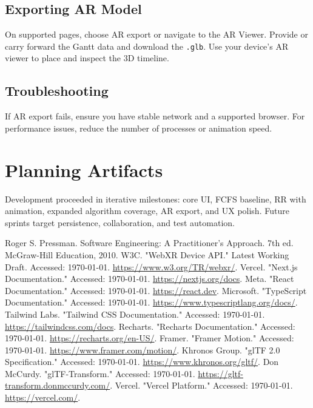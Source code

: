 \documentclass[12pt,a4paper,oneside]{report}
\begin{document}
\section*{Exporting AR Model}
On supported pages, choose AR export or navigate to the AR Viewer. Provide or carry forward the Gantt data and download the \texttt{.glb}. Use your device’s AR viewer to place and inspect the 3D timeline.

\section*{Troubleshooting}
If AR export fails, ensure you have stable network and a supported browser. For performance issues, reduce the number of processes or animation speed.

\chapter{Planning Artifacts}
Development proceeded in iterative milestones: core UI, FCFS baseline, RR with animation, expanded algorithm coverage, AR export, and UX polish. Future sprints target persistence, collaboration, and test automation.

\clearpage
\renewcommand\refname{References}
\begin{thebibliography}{99}
\setlength{\itemsep}{\baselineskip} %
\setlength{\parsep}{0pt}
\setlength{\parskip}{0pt}
\small %
 Roger S. Pressman. Software Engineering: A Practitioner’s Approach. 7th ed. McGraw-Hill Education, 2010.
 W3C. "WebXR Device API." Latest Working Draft. Accessed: \today. \url{https://www.w3.org/TR/webxr/}.
 Vercel. "Next.js Documentation." Accessed: \today. \url{https://nextjs.org/docs}.
 Meta. "React Documentation." Accessed: \today. \url{https://react.dev}.
 Microsoft. "TypeScript Documentation." Accessed: \today. \url{https://www.typescriptlang.org/docs/}.
 Tailwind Labs. "Tailwind CSS Documentation." Accessed: \today. \url{https://tailwindcss.com/docs}.
 Recharts. "Recharts Documentation." Accessed: \today. \url{https://recharts.org/en-US/}.
 Framer. "Framer Motion." Accessed: \today. \url{https://www.framer.com/motion/}.
 Khronos Group. "glTF 2.0 Specification." Accessed: \today. \url{https://www.khronos.org/gltf/}.
 Don McCurdy. "glTF-Transform." Accessed: \today. \url{https://gltf-transform.donmccurdy.com/}.
 Vercel. "Vercel Platform." Accessed: \today. \url{https://vercel.com/}.
\end{thebibliography}
\end{document}
